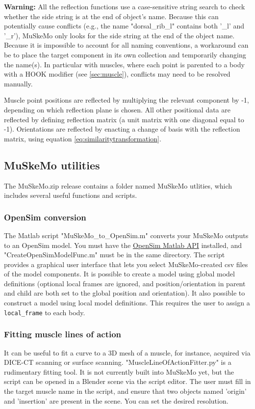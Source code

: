 \documentclass{article}
\begin{document}
\textbf{Warning:} All the reflection functions use a case-sensitive string search to check whether the side string is at the end of object's name. Because this can potentially cause conflicts (e.g., the name "dorsal\_rib\_l" contains both '\_l' and '\_r'), MuSkeMo only looks for the side string at the end of the object name. Because it is impossible to account for all naming conventions, a workaround can be to place the target component in its own collection and temporarily changing the name(s). In particular with muscles, where each point is parented to a body with a HOOK modifier (see \ref{sec:muscle}), conflicts may need to be resolved manually.

Muscle point positions are reflected by multiplying the relevant component by -1, depending on which reflection plane is chosen. All other positional data are reflected by defining reflection matrix (a unit matrix with one diagonal equal to -1). Orientations are reflected by enacting a change of basis with the reflection matrix, using equation \ref{eq:similaritytransformation}.

\subsection{MuSkeMo utilities}
\label{sec:muskemoutilities}

The MuSkeMo.zip release contains a folder named MuSkeMo utlities, which includes several useful functions and scripts. 

\subsubsection{OpenSim conversion}
The Matlab script "MuSkeMo\_to\_OpenSim.m" converts your MuSkeMo outputs to an OpenSim model. You must have the \href{https://opensimconfluence.atlassian.net/wiki/spaces/OpenSim/pages/53089380/Scripting+with+Matlab}{OpenSim Matlab API} installed, and "CreateOpenSimModelFunc.m" must be in the same directory. The script provides a graphical user interface that lets you select MuSkeMo-created csv files of the model components. It is possible to create a model using global model definitions (optional local frames are ignored, and position/orientation in parent and child are both set to the global position and orientation). It also possible to construct a model using local model definitions. This requires the user to assign a  \texttt{local\_frame} to each body. 


\subsubsection{Fitting muscle lines of action}
It can be useful to fit a curve to a 3D mesh of a muscle, for instance, acquired via DICE-CT scanning or surface scanning. "MuscleLineOfActionFitter.py" is a rudimentary fitting tool. It is not currently built into MuSkeMo yet, but the script can be opened in a Blender scene via the script editor. The user must fill in the target muscle name in the script, and ensure that two objects named 'origin' and 'insertion' are present in the scene. You can set the desired resolution.
\end{document}
